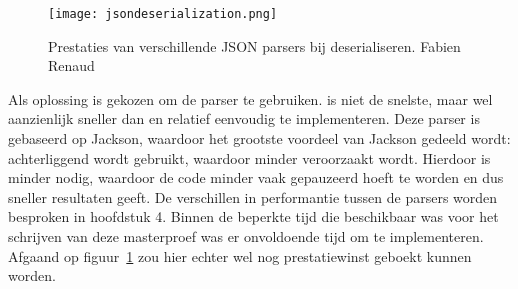 \begin{figure}[!h]
	\centering
	\texttt{[image: jsondeserialization.png]}
	\caption[Prestaties van JSON parsers]{Prestaties van verschillende JSON parsers bij deserialiseren.  Fabien Renaud}
	\label{fig:jsonparsersdeserialize}
\end{figure}

Als oplossing is gekozen om de  parser te gebruiken.  is niet de snelste, maar wel aanzienlijk sneller dan  en relatief eenvoudig te implementeren. Deze parser is gebaseerd op Jackson, waardoor het grootste voordeel van Jackson gedeeld wordt: achterliggend wordt  gebruikt, waardoor minder  veroorzaakt wordt. Hierdoor is minder  nodig, waardoor de code minder vaak gepauzeerd hoeft te worden en dus sneller resultaten geeft. De verschillen in performantie tussen de parsers worden besproken in hoofdstuk 4. Binnen de beperkte tijd die beschikbaar was voor het schrijven van deze masterproef was er onvoldoende tijd om  te implementeren. Afgaand op figuur~\ref{fig:jsonparsersdeserialize} zou hier echter wel nog prestatiewinst geboekt kunnen worden.